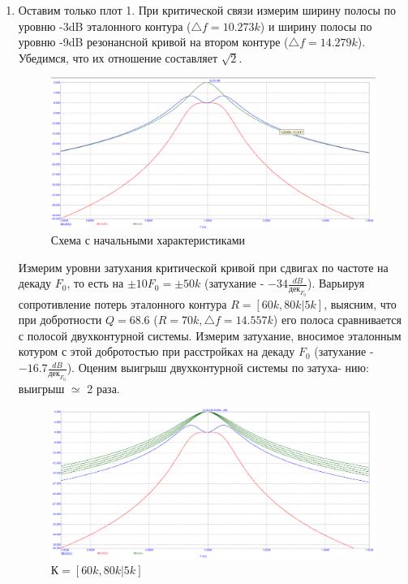 \documentclass[a4paper, 12pt]{article}%
\begin{document}
\begin{enumerate}
\newpage

\item Оставим только плот 1. При критической связи измерим ширину полосы по уровню
-3dB эталонного контура ($\bigtriangleup f = 10.273k$) и ширину полосы по уровню -9dB резонансной кривой на втором контуре ($\bigtriangleup f = 14.279k$). Убедимся, что их отношение составляет $\sqrt{2}$.

\begin{figure}[h!]
\centering
\includegraphics[scale = 0.4]{images/plot5_1.png}
\caption{Схема с начальными характеристиками}
\label{fig:Image1}
\end{figure}

Измерим уровни затухания критической кривой при сдвигах по частоте на декаду $F_0$, то есть на $\pm 10 F_0 = \pm 50k$ (затухание - $-34 \frac{dB}{\text{дек}_{F_0}}$). Варьируя сопротивление потерь эталонного контура $R = [60k, 80k | 5k]$, выясним, что при добротности $Q = 68.6$ ($R = 70k, \bigtriangleup f = 14.557k$) его полоса сравнивается с полосой двухконтурной системы. Измерим затухание, вносимое эталонным котуром с этой добротостью при расстройках на декаду $F_0$ (затухание - $- 16.7 \frac{dB}{\text{дек}_{F_0}}$). Оценим выигрыш двухконтурной системы по затуха-
нию: выигрыш $\simeq$ 2 раза.

\begin{figure}[h!]
\centering
\includegraphics[scale = 0.4]{images/plot5_2.png}
\caption{$К = [60k, 80k | 5k]$}
\label{fig:Image1}
\end{figure}


\end{enumerate}
\end{document}
